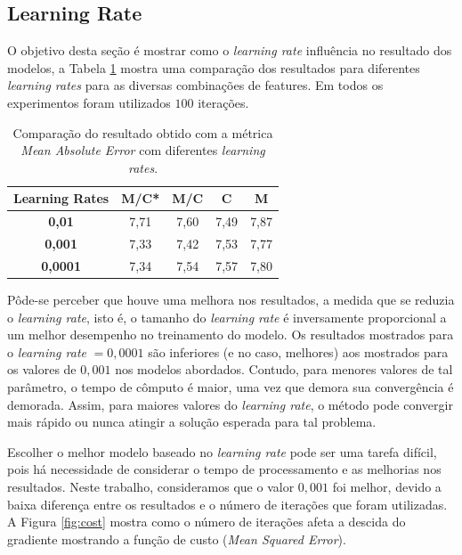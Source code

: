 \documentclass[conference]{IEEEtran}
\begin{document}
\subsection{Learning Rate}

O objetivo desta seção é mostrar como o \emph{learning rate} influência no resultado dos modelos, a Tabela \ref{tab:rates} mostra uma comparação dos resultados para diferentes \emph{learning rates} para as diversas combinações de features. Em todos os experimentos foram utilizados $100$ iterações.

\begin{table}[!h]
	\centering

	\begin{tabular}{ccccc} \\ \hline
		\textbf{Learning Rates} & \textbf{M/C*} & \textbf{M/C} & \textbf{C} & \textbf{M} \\ \hline
		\textbf{0,01}   & 7,71          & 7,60         & 7,49       & 7,87       \\
		\textbf{0,001}  & 7,33          & 7,42         & 7,53       & 7,77       \\
		\textbf{0,0001} & 7,34          & 7,54         & 7,57       & 7,80       \\ \hline
	\end{tabular}
	\caption{Comparação do resultado obtido com a métrica \textit{Mean Absolute Error} com diferentes \emph{learning rates}.}
	\label{tab:rates}
\end{table}

Pôde-se perceber que houve uma melhora nos resultados, a medida que se reduzia o \textit{learning rate}, isto é, o tamanho do \textit{learning rate} é inversamente proporcional a um melhor desempenho no treinamento do modelo. Os resultados mostrados para o \emph{learning rate} $= 0,0001$ são inferiores (e no caso, melhores) aos mostrados para os valores de $0,001$ nos modelos abordados. Contudo, para menores valores de tal parâmetro, o tempo de cômputo é maior, uma vez que demora sua convergência é demorada. Assim, para maiores valores do \textit{learning rate}, o método pode convergir mais rápido ou nunca atingir a solução esperada para tal problema.

Escolher o melhor modelo baseado no \textit{learning rate} pode ser uma tarefa difícil, pois há necessidade de considerar o tempo de processamento e as melhorias nos resultados. Neste trabalho, consideramos que o valor $0,001$ foi melhor, devido a baixa diferença entre os resultados e o número de iterações que foram utilizadas. A Figura \ref{fig:cost} mostra como o número de iterações afeta a descida do gradiente mostrando a função de custo (\emph{Mean Squared Error}).
\end{document}
